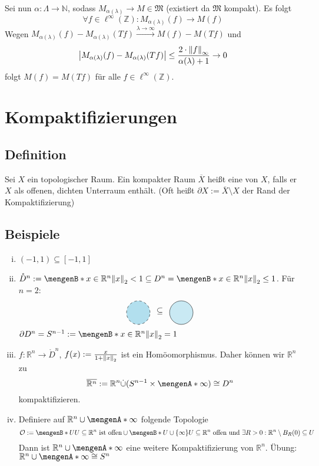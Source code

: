 Sei nun $\alpha : \Lambda \to \mathds{N}$, sodass $M_{\alpha(\lambda)} \to M \in \mathfrak{M}$ (existiert da $\mathfrak{M}$ kompakt). Es folgt
\[
	\forall f \in \ell^\infty(\mathds{Z}) : M_{\alpha(\lambda )}(f) \to M(f) 
\]
Wegen $M_{\alpha(\lambda )}(f) - M_{\alpha(\lambda )}(T f) \xrightarrow{\lambda  \to \infty} M(f) - M(T f) $ und
\begin{align*}
	\abs*{M_{\alpha(\lambda )}(f) - M_{\alpha(\lambda )}(T f)} \le \frac{2 \cdot \norm[\infty]{f} }{\alpha(\lambda )+1} \to 0  
\end{align*}
folgt $M(f) = M(T f)$ für alle $f \in \ell^\infty(\mathds{Z})$. \bewende
\newpage

\section{Kompaktifizierungen} %
\label{sec:5}

\subsection[Definition: Kompaktifizierung]{Definition} %
\label{sub:51}
Sei $X$ ein topologischer Raum. Ein kompakter Raum $\overline{X}$ heißt eine  von $X$, falls er $X$ als offenen, dichten Unterraum enthält. 
(Oft heißt $\partial X := \overline{X} \setminus X $ der Rand der Kompaktifizierung)

\subsection[Beispiele für Kompaktifizierungen]{Beispiele} %
\label{sub:52}
\begin{enumerate}[(i)]
	\item $(-1,1) \subseteq [-1,1]$
	\item $\mathring D^n := \set[x \in \mathds{R}^n]{\norm[2]{x} < 1 } \subseteq D^n = \set[x \in \mathds{R}^n]{\norm[2]{x} \le 1 }  $. Für $n=2$:
	\[
		\tikz[baseline=-0.5]{\draw[dashed, fill=LightBlue2] (0,0) circle[radius=0.5]} \enspace\subseteq \enspace
		\tikz[baseline=-0.5]{\draw[fill=LightBlue2!70] (0,0) circle[radius=0.5]}
	\]
	$\partial D^n = S^{n-1} := \set[x \in \mathds{R}^n]{\norm[2]{x} = 1 } $
	\item $f : \mathds{R}^n \to \mathring D^n$, $f(x) := \frac{x}{1+ \norm[2]{x}} $ ist ein Homöomorphismus. Daher können wir $\mathds{R}^n$ zu
	\[
		\overline{\mathds{R}^n} := \mathds{R}^n \dot\cup (S^{n-1} \times \set{\infty} ) \cong D^n 
	\]
	kompaktifizieren.
	\item Definiere auf $\mathds{R}^n \cup \set{\infty}$ folgende Topologie 
	\[
		\mathcal{O} := \set[U]{U \subseteq \mathds{R}^n \text{ ist offen}} \cup \set[U \cup \{\infty\}]{U \subseteq \mathds{R}^n \text{ offen und } \exists R > 0 : 
		\mathds{R}^n \setminus B_R(0) \subseteq U} 
	\]
	Dann ist $\mathds{R}^n \cup \set{\infty}$ eine weitere Kompaktifizierung von $\mathds{R}^n$. Übung: $\mathds{R}^n \cup \set{\infty} \cong S^n $
\end{enumerate}

